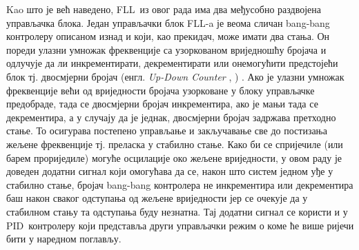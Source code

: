 \documentclass[master]{finthesis}
\makeatletter
\newcommand*{\engl}[2][\@empty]{%
    \edef\theacronym{#1}%
    (енгл. \foreignlanguage{english}{\emph{#2}%
    \ifx\theacronym\@empty \else , #1\fi})%
}
\def \FLL  {FLL} %
\def \PID  {PID} %
\makeatother
\begin{document}
Kao што је већ наведено, \FLL\ из овог рада има два међусобно раздвојена управљачка блока. Један управљачки блок \FLL-a је веома сличан bang-bang контролеру описаном изнад и који, као прекидач, може имати два стања. Он пореди улазни умножак фреквенције са узоркованом вриједношћу бројача и одлучује да ли инкрементирати, декрементирати или онемогућити предстојећи блок тј. двосмјерни бројач \engl{Up-Down Counter}. Ако је улазни умножак фреквенције већи од вриједности бројача узорковане у блоку управљачке предобраде, тада се двосмјерни бројач инкрементира, ако је мањи тада се декрементира, а у случају да је једнак, двосмјерни бројач задржава претходно стање. То осигурава постепено управљање и закључавање све до постизања жељене фреквенције тј. преласка у стабилно стање. Како би се спријечиле (или барем прориједиле) могуће осцилације око жељене вриједности, у овом раду је доведен додатни сигнал који омогућава да се, након што систем једном уђе у стабилно стање, бројач bang-bang контролера не инкрементира или декрементира баш након сваког одступања од жељене вриједности јер се очекује да у стабилном стању та одступања буду незнатна. Тај додатни сигнал се користи и у \PID\ контролеру који представља други управљачки режим о коме ће више ријечи бити у наредном поглављу.
\end{document}

